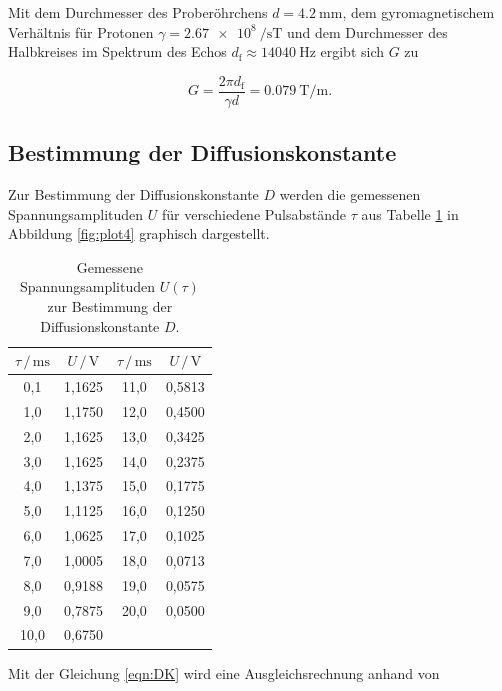 Mit dem Durchmesser des Proberöhrchens $d = \SI{4.2}{\milli\metre}$, dem gyromagnetischem Verhältnis für Protonen 
$\gamma = \SI{2.67e8}{\per\second\tesla}$ und dem Durchmesser des Halbkreises im Spektrum des Echos $d_\text{f} \approx \SI{14040}{\hertz}$
ergibt sich $G$ zu 

\begin{equation*}
  G = \frac{2\pi d_\text{f}}{\gamma d} = \SI{0.079}{\tesla\per\metre}.
\end{equation*}

\subsection{Bestimmung der Diffusionskonstante}

Zur Bestimmung der Diffusionskonstante $D$ werden die gemessenen Spannungsamplituden $U$ für verschiedene Pulsabstände $\tau$ aus 
Tabelle \ref{tab:mess3} in Abbildung \ref{fig:plot4} graphisch dargestellt.  

\begin{table}
  \centering
  \caption{Gemessene Spannungsamplituden $U\left(\tau\right)$ zur Bestimmung der Diffusionskonstante $D$.}
  \label{tab:mess3}
  \begin{tabular}{c c c c}
  \toprule
  $\tau \,/\, \si{\milli\second}$ & $U \,/\, \si{\volt}$ & $\tau \,/\, \si{\milli\second}$
  & $U \,/\, \si{\volt}$\\
  \midrule 
       0,1 & 1,1625 & 11,0 & 0,5813\\
       1,0 & 1,1750 & 12,0 & 0,4500\\
       2,0 & 1,1625 & 13,0 & 0,3425\\
       3,0 & 1,1625 & 14,0 & 0,2375\\
       4,0 & 1,1375 & 15,0 & 0,1775\\
       5,0 & 1,1125 & 16,0 & 0,1250\\
       6,0 & 1,0625 & 17,0 & 0,1025\\
       7,0 & 1,0005 & 18,0 & 0,0713\\
       8,0 & 0,9188 & 19,0 & 0,0575\\
       9,0 & 0,7875 & 20,0 & 0,0500\\
      10,0 & 0,6750 &  & \\
  \bottomrule
  \end{tabular}
\end{table}

Mit der Gleichung \eqref{eqn:DK} wird eine Ausgleichsrechnung anhand von 

